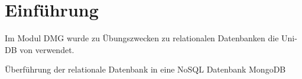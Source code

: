 \section{Einführung}
Im Modul DMG wurde zu Übungszwecken zu relationalen Datenbanken die Uni-DB 
von 
verwendet.


Überführung der relationale Datenbank in eine NoSQL Datenbank
MongoDB
